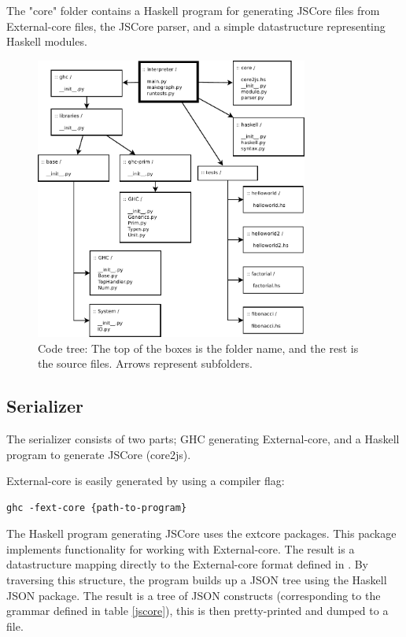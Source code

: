 The "core" folder contains a Haskell program for generating JSCore files from External-core
files, the JSCore parser, and a simple datastructure representing Haskell modules.

\begin{figure}[H]
\centering
\includegraphics[width=0.8\textwidth]{diags/organization}
\caption[Code tree: organization]{Code tree: The top of the boxes is the folder name, 
and the rest is the source files. Arrows represent subfolders.}
\label{organization}
\end{figure}

\subsection{Serializer}

The serializer consists of two parts; GHC generating External-core, and 
a Haskell program to generate JSCore (core2js).

External-core is easily generated by using a compiler flag:
\begin{lstlisting}
ghc -fext-core {path-to-program}
\end{lstlisting}


The Haskell program generating JSCore uses the extcore packages. This package
implements functionality for working with External-core. The result is a datastructure
mapping directly to the External-core format defined in \cite{tolmach2010ghc}. By traversing
this structure, the program builds up a JSON tree using the Haskell JSON package.
The result is a tree of JSON constructs (corresponding to the grammar defined 
in table \ref{jscore}), this is then pretty-printed and dumped to a file.

